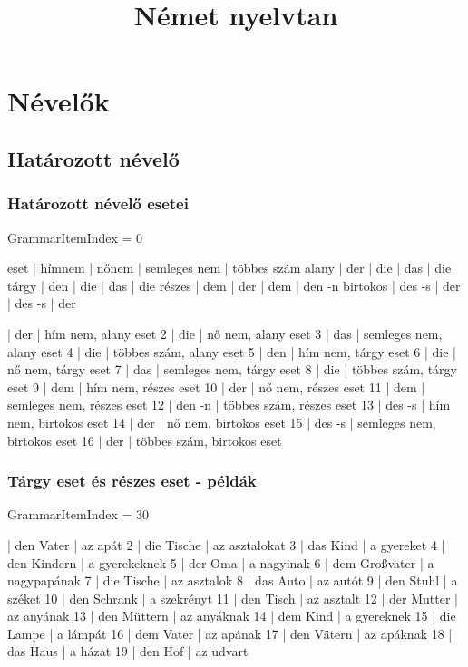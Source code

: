 \documentclass{article}
\title{Német nyelvtan}
\newenvironment{desc}{\verbatim}{\endverbatim}
\newenvironment{exmp}{\verbatim}{\endverbatim}
\begin{document}
\maketitle

\tableofcontents

\section{Névelők}

\subsection{Határozott névelő}

\subsubsection{Határozott névelő esetei}

GrammarItemIndex = 0

\begin{desc}
eset     | hímnem | nőnem | semleges nem | többes szám
alany    | der    | die   | das          | die
tárgy    | den    | die   | das          | die
részes   | dem    | der   | dem          | den -n
birtokos | des -s | der   | des -s       | der
\end{desc}

\begin{exmp}
1 | der | hím nem, alany eset
2 | die | nő nem, alany eset
3 | das | semleges nem, alany eset
4 | die | többes szám, alany eset
5 | den | hím nem, tárgy eset
6 | die | nő nem, tárgy eset
7 | das | semleges nem, tárgy eset
8 | die | többes szám, tárgy eset
9 | dem | hím nem, részes eset
10 | der | nő nem, részes eset
11 | dem | semleges nem, részes eset
12 | den -n | többes szám, részes eset
13 | des -s | hím nem, birtokos eset
14 | der | nő nem, birtokos eset
15 | des -s | semleges nem, birtokos eset
16 | der | többes szám, birtokos eset
\end{exmp}

\subsubsection{Tárgy eset és részes eset - példák}

GrammarItemIndex = 30

\begin{exmp}
1 | den Vater | az apát
2 | die Tische | az asztalokat
3 | das Kind | a gyereket
4 | den Kindern | a gyerekeknek
5 | der Oma | a nagyinak
6 | dem Großvater | a nagypapának
7 | die Tische | az asztalok
8 | das Auto | az autót
9 | den Stuhl | a széket
10 | den Schrank | a szekrényt
11 | den Tisch | az asztalt
12 | der Mutter | az anyának
13 | den Müttern | az anyáknak
14 | dem Kind | a gyereknek
15 | die Lampe | a lámpát
16 | dem Vater | az apának
17 | den Vätern | az apáknak
18 | das Haus | a házat
19 | den Hof | az udvart
\end{exmp}
\end{document}
